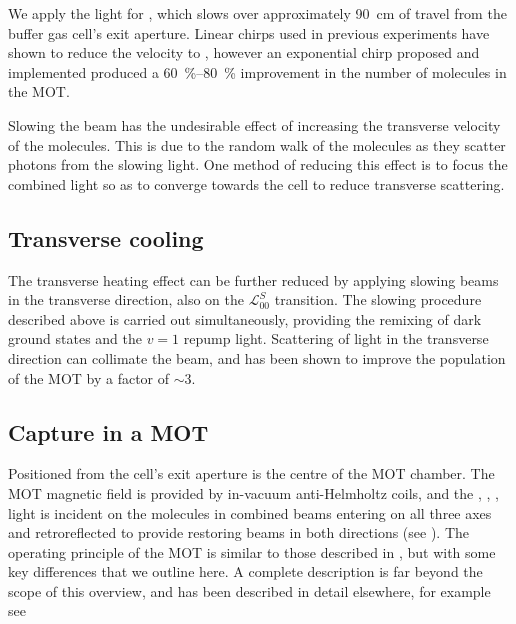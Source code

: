 We apply the light for , which slows over approximately
\SI{90}{\centi\meter} of travel from the buffer gas cell's exit aperture.
Linear chirps used in previous experiments have shown to reduce the velocity to
, however an exponential chirp proposed  and implemented
 produced a \SIrange{60}{80}{\percent} improvement in the number
of molecules in the MOT.

Slowing the beam has the undesirable effect of increasing the transverse
velocity of the molecules. This is due to the random walk of the molecules as
they scatter photons from the slowing light. One method of reducing this effect
is to focus the combined light so as to converge towards the cell to reduce
transverse scattering. 

\subsection*{Transverse cooling}


The transverse heating effect can be further reduced by applying
slowing beams in the transverse direction, also on the $\mathcal{L}_{00}^S$
transition. The slowing procedure described above is carried out
simultaneously, providing the remixing of dark ground states and the $v=1$
repump light.
%
Scattering of light in the transverse direction can collimate the beam, and has
been shown to improve the population of the MOT by a factor of $\sim3$. 

\subsection*{Capture in a MOT}

Positioned  from the cell's exit aperture is the 
centre of the MOT chamber. The MOT magnetic field is provided by in-vacuum
anti-Helmholtz coils, and the , , ,
 light is incident on the molecules in combined beams entering
on all three axes and retroreflected to provide restoring beams in both
directions (see ).
%
The operating principle of the \CaF{} MOT is similar to those described in
, but with some key differences that we outline
here. A complete description is far beyond the scope of this overview, and has
been described in detail elsewhere, for example see 

